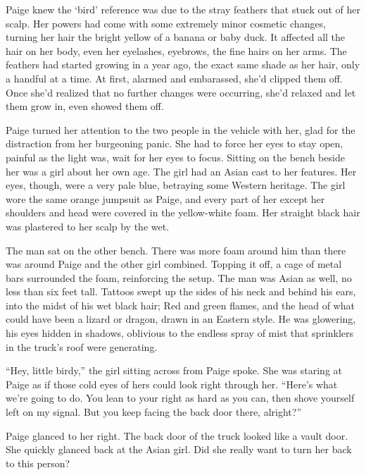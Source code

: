 Paige knew the `bird' reference was due to the stray feathers that stuck out of her scalp.  Her powers had come with some extremely minor cosmetic changes, turning her hair the bright yellow of a banana or baby duck.  It affected all the hair on her body, even her eyelashes, eyebrows, the fine hairs on her arms.  The feathers had started growing in a year ago, the exact same shade as her hair, only a handful at a time.  At first, alarmed and embarassed, she'd clipped them off.  Once she'd realized that no further changes were occurring, she'd relaxed and let them grow in, even showed them off.



Paige turned her attention to the two people in the vehicle with her, glad for the distraction from her burgeoning panic.  She had to force her eyes to stay open, painful as the light was, wait for her eyes to focus.  Sitting on the bench beside her was a girl about her own age.  The girl had an Asian cast to her features.  Her eyes, though, were a very pale blue, betraying some Western heritage.  The girl wore the same orange jumpsuit as Paige, and every part of her except her shoulders and head were covered in the yellow-white foam.  Her straight black hair was plastered to her scalp by the wet.



The man sat on the other bench.  There was more foam around him than there was around Paige and the other girl combined.  Topping it off, a cage of metal bars surrounded the foam, reinforcing the setup.  The man was Asian as well, no less than six feet tall.  Tattoos swept up the sides of his neck and behind his ears, into the midst of his wet black hair; Red and green flames, and the head of what could have been a lizard or dragon, drawn in an Eastern style.  He was glowering, his eyes hidden in shadows, oblivious to the endless spray of mist that sprinklers in the truck's roof were generating.



``Hey, little birdy,'' the girl sitting across from Paige spoke.  She was staring at Paige as if those cold eyes of hers could look right through her.  ``Here's what we're going to do.  You lean to your right as hard as you can, then shove yourself left on my signal.  But you keep facing the back door there, alright?''



Paige glanced to her right.  The back door of the truck looked like a vault door.  She quickly glanced back at the Asian girl.  Did she really want to turn her back to this person?



